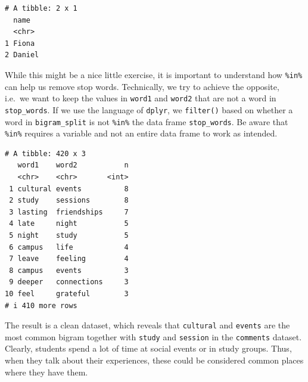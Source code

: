 \documentclass[
  letterpaper,
]{krantz}
\makeatletter
\newenvironment{Shaded}{\begin{snugshade}}{\end{snugshade}}
\newcommand{\AttributeTok}[1]{\textcolor[rgb]{0.40,0.45,0.13}{#1}}
\newcommand{\ConstantTok}[1]{\textcolor[rgb]{0.56,0.35,0.01}{#1}}
\newcommand{\FunctionTok}[1]{\textcolor[rgb]{0.28,0.35,0.67}{#1}}
\newcommand{\NormalTok}[1]{\textcolor[rgb]{0.00,0.23,0.31}{#1}}
\newcommand{\OtherTok}[1]{\textcolor[rgb]{0.00,0.23,0.31}{#1}}
\newcommand{\SpecialCharTok}[1]{\textcolor[rgb]{0.37,0.37,0.37}{#1}}
\newenvironment{kframe}{%
\medskip{}
\setlength{\fboxsep}{.8em}
 \def\at@end@of@kframe{}%
 \ifinner\ifhmode%
  \def\at@end@of@kframe{\end{minipage}}%
  \begin{minipage}{\columnwidth}%
 \fi\fi%
 \def\FrameCommand##1{\hskip\@totalleftmargin \hskip-\fboxsep
 \colorbox{shadecolor}{##1}\hskip-\fboxsep
     \hskip-\linewidth \hskip-\@totalleftmargin \hskip\columnwidth}%
 \MakeFramed {\advance\hsize-\width
   \@totalleftmargin\z@ \linewidth\hsize
   \@setminipage}}%
 {\par\unskip\endMakeFramed%
 \at@end@of@kframe}
\renewenvironment{Shaded}{\begin{kframe}}{\end{kframe}}
\makeatother
\begin{document}
\begin{verbatim}
# A tibble: 2 x 1
  name  
  <chr> 
1 Fiona 
2 Daniel
\end{verbatim}

While this might be a nice little exercise, it is important to
understand how \texttt{\%in\%} can help us remove stop words.
Technically, we try to achieve the opposite, i.e.~we want to keep the
values in \texttt{word1} and \texttt{word2} that are not a word in
\texttt{stop\_words}. If we use the language of \texttt{dplyr}, we
\texttt{filter()} based on whether a word in \texttt{bigram\_split} is
not \texttt{\%in\%} the data frame \texttt{stop\_words}. Be aware that
\texttt{\%in\%} requires a variable and not an entire data frame to work
as intended.

\begin{Shaded}
\end{Shaded}

\begin{verbatim}
# A tibble: 420 x 3
   word1    word2           n
   <chr>    <chr>       <int>
 1 cultural events          8
 2 study    sessions        8
 3 lasting  friendships     7
 4 late     night           5
 5 night    study           5
 6 campus   life            4
 7 leave    feeling         4
 8 campus   events          3
 9 deeper   connections     3
10 feel     grateful        3
# i 410 more rows
\end{verbatim}

The result is a clean dataset, which reveals that \texttt{cultural} and
\texttt{events} are the most common bigram together with \texttt{study}
and \texttt{session} in the \texttt{comments} dataset. Clearly, students
spend a lot of time at social events or in study groups. Thus, when they
talk about their experiences, these could be considered common places
where they have them.
\end{document}
